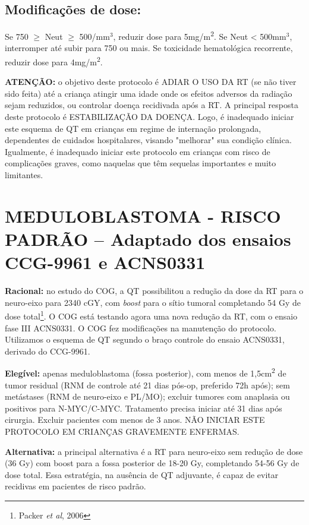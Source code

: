 \documentclass[11pt,a4paper,oldfontcommands]{memoir}
\begin{document}
\subsection{Modificações de dose:}
Se 750 $\geq$ Neut $\geq$ 500/mm\(^3\), reduzir dose para 5mg/m\textsuperscript{2}. Se Neut < 500mm\(^3\), interromper até subir para 750 ou mais. Se toxicidade hematológica recorrente, reduzir dose para 4mg/m\textsuperscript{2}.

\textbf{ATENÇÃO:} o objetivo deste protocolo é ADIAR O USO DA RT (se não tiver sido feita) até a criança atingir uma idade onde os efeitos adversos da radiação sejam reduzidos, ou controlar doença recidivada após a RT. A principal resposta deste protocolo é ESTABILIZAÇÃO DA DOENÇA. Logo, é inadequado iniciar este esquema de QT em crianças em regime de internação prolongada, dependentes de cuidados hospitalares, visando "melhorar" sua condição clínica. Igualmente, é inadequado iniciar este protocolo em crianças com risco de complicações graves, como naquelas que têm sequelas importantes e muito limitantes.\\

\cleardoublepage
\section{MEDULOBLASTOMA - RISCO PADRÃO -- Adaptado dos ensaios CCG-9961 e ACNS0331}
{\let\thefootnote\relax{}}
\textbf{Racional:} no estudo do COG, a QT possibilitou a redução da dose da RT para o neuro-eixo para 2340 cGY, com \textit{boost} para o sítio tumoral completando 54 Gy de dose total\footnote{Packer \textit{et al}, 2006}. O COG está testando agora uma nova redução da RT, com o ensaio fase III ACNS0331. O COG fez modificações na manutenção do protocolo. Utilizamos o esquema de QT segundo o braço controle do ensaio ACNS0331, derivado do CCG-9961.

\textbf{Elegível:} apenas meduloblastoma (fossa posterior), com menos de 1,5cm\textsuperscript{2} de tumor residual (RNM de controle até 21 dias pós-op, preferido 72h após); sem metástases (RNM de neuro-eixo e PL/MO); excluir tumores com anaplasia ou positivos para N-MYC/C-MYC. Tratamento precisa iniciar até 31 dias após cirurgia. Excluir pacientes com menos de 3 anos. NÃO INICIAR ESTE PROTOCOLO EM CRIANÇAS GRAVEMENTE ENFERMAS.

\textbf{Alternativa:} a principal alternativa é a RT para neuro-eixo sem redução de dose (36 Gy) com boost para a fossa posterior de 18-20 Gy, completando 54-56 Gy de dose total. Essa estratégia, na ausência de QT adjuvante, é capaz de evitar recidivas em pacientes de risco padrão.
\end{document}
